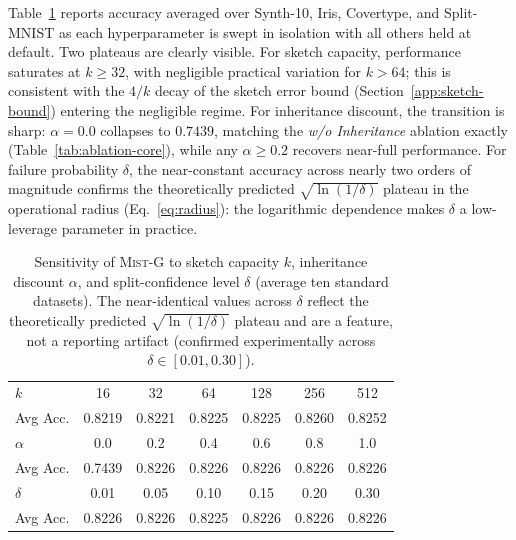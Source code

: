 \documentclass{article}
\newcommand{\mist}{\textsc{Mist}}
\begin{document}
Table~\ref{tab:ablation-k-alpha} reports accuracy averaged over Synth-10,
Iris, Covertype, and Split-MNIST as each hyperparameter is swept in
isolation with all others held at default. Two plateaus are clearly
visible. For sketch capacity, performance saturates at $k \geq 32$, with negligible practical variation for $k > 64$; this is consistent with the $4/k$
decay of the sketch error bound (Section~\ref{app:sketch-bound}) entering
the negligible regime. For inheritance discount, the transition is sharp:
$\alpha{=}0.0$ collapses to $0.7439$, matching the \emph{w/o Inheritance}
ablation exactly (Table~\ref{tab:ablation-core}), while any $\alpha \geq 0.2$
recovers near-full performance. For failure probability $\delta$, the
near-constant accuracy across nearly two orders of magnitude confirms the
theoretically predicted $\sqrt{\ln(1/\delta)}$ plateau in the operational
radius (Eq.~\eqref{eq:radius}): the logarithmic dependence makes
$\delta$ a low-leverage parameter in practice.

\begin{table}[h]
\caption{Sensitivity of \mist{}-G to sketch capacity $k$, inheritance
discount $\alpha$, and split-confidence level $\delta$ (average ten standard datasets). The near-identical
values across $\delta$ reflect the theoretically predicted
$\sqrt{\ln(1/\delta)}$ plateau and are a feature, not a reporting artifact
(confirmed experimentally across $\delta \in [0.01, 0.30]$).}
\label{tab:ablation-k-alpha}
\centering
\small
\begin{tabular}{lcccccc}
\toprule
$k$ & 16 & 32 & 64 & 128 & 256 & 512 \\
Avg Acc. & 0.8219 & 0.8221 & 0.8225 & 0.8225 & 0.8260 & 0.8252 \\
\midrule
$\alpha$ & 0.0 & 0.2 & 0.4 & 0.6 & 0.8 & 1.0 \\
Avg Acc. & 0.7439 & 0.8226 & 0.8226 & 0.8226 & 0.8226 & 0.8226 \\
\midrule
$\delta$ & 0.01 & 0.05 & 0.10 & 0.15 & 0.20 & 0.30 \\
Avg Acc. & 0.8226 & 0.8226 & 0.8225 & 0.8226 & 0.8226 & 0.8226 \\
\bottomrule
\end{tabular}
\end{table}
\end{document}
